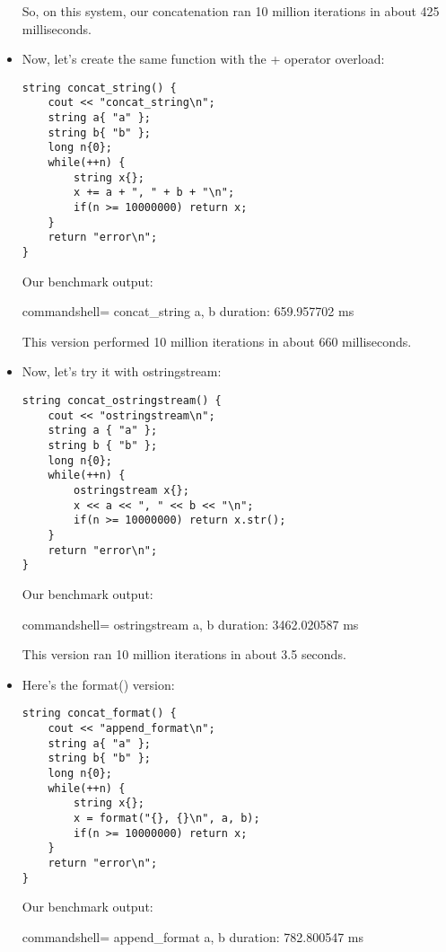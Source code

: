 \begin{itemize}
So, on this system, our concatenation ran 10 million iterations in about 425 milliseconds.

\item 
Now, let's create the same function with the + operator overload:

\begin{lstlisting}[style=styleCXX]
string concat_string() {
	cout << "concat_string\n";
	string a{ "a" };
	string b{ "b" };
	long n{0};
	while(++n) {
		string x{};
		x += a + ", " + b + "\n";
		if(n >= 10000000) return x;
	}
	return "error\n";
}
\end{lstlisting}

Our benchmark output:

\begin{tcblisting}{commandshell={}}
concat_string
a, b
duration: 659.957702 ms
\end{tcblisting}

This version performed 10 million iterations in about 660 milliseconds.

\item 
Now, let's try it with ostringstream:

\begin{lstlisting}[style=styleCXX]
string concat_ostringstream() {
	cout << "ostringstream\n";
	string a { "a" };
	string b { "b" };
	long n{0};
	while(++n) {
		ostringstream x{};
		x << a << ", " << b << "\n";
		if(n >= 10000000) return x.str();
	}
	return "error\n";
}
\end{lstlisting}

Our benchmark output:

\begin{tcblisting}{commandshell={}}
ostringstream
a, b
duration: 3462.020587 ms
\end{tcblisting}

This version ran 10 million iterations in about 3.5 seconds.

\item 
Here's the format() version:

\begin{lstlisting}[style=styleCXX]
string concat_format() {
	cout << "append_format\n";
	string a{ "a" };
	string b{ "b" };
	long n{0};
	while(++n) {
		string x{};
		x = format("{}, {}\n", a, b);
		if(n >= 10000000) return x;
	}
	return "error\n";
}
\end{lstlisting}

Our benchmark output:

\begin{tcblisting}{commandshell={}}
append_format
a, b
duration: 782.800547 ms
\end{tcblisting}


\end{itemize}
